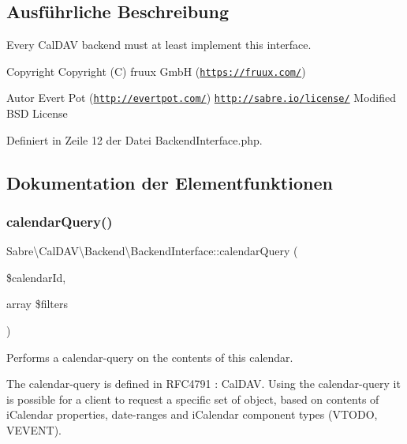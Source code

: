 \subsection{Ausführliche Beschreibung}
Every Cal\+D\+AV backend must at least implement this interface.

\begin{DoxyCopyright}{Copyright}
Copyright (C) fruux GmbH (\href{https://fruux.com/}{\tt https\+://fruux.\+com/}) 
\end{DoxyCopyright}
\begin{DoxyAuthor}{Autor}
Evert Pot (\href{http://evertpot.com/}{\tt http\+://evertpot.\+com/})  \href{http://sabre.io/license/}{\tt http\+://sabre.\+io/license/} Modified B\+SD License 
\end{DoxyAuthor}


Definiert in Zeile 12 der Datei Backend\+Interface.\+php.



\subsection{Dokumentation der Elementfunktionen}
\mbox{\label{interface_sabre_1_1_cal_d_a_v_1_1_backend_1_1_backend_interface_aecd41f613576b9d7d6d16d3039c692ae}} 
\subsubsection{\texorpdfstring{calendar\+Query()}{calendarQuery()}}
{\footnotesize\ttfamily Sabre\textbackslash{}\+Cal\+D\+A\+V\textbackslash{}\+Backend\textbackslash{}\+Backend\+Interface\+::calendar\+Query (\begin{DoxyParamCaption}\item[{}]{\$calendar\+Id,  }\item[{array}]{\$filters }\end{DoxyParamCaption})}

Performs a calendar-\/query on the contents of this calendar.

The calendar-\/query is defined in R\+F\+C4791 \+: Cal\+D\+AV. Using the calendar-\/query it is possible for a client to request a specific set of object, based on contents of i\+Calendar properties, date-\/ranges and i\+Calendar component types (V\+T\+O\+DO, V\+E\+V\+E\+NT).

